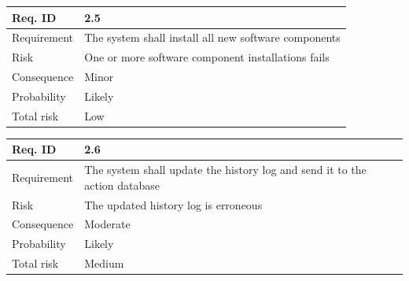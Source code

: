 
\begin{table}[H]
\centering
\begin{tabularx}{1.0\textwidth}{
    |p{}%
    |p{}|%
}
\hline

Req. ID
& 2.5
\\
\hline

Requirement
& The system shall install all new software components
\\
\hline

Risk
& 
One or more software component installations fails
\\
\hline

Consequence
&
Minor
\\
\hline

Probability
&
Likely
\\
\hline

Total risk
&
Low
\\
\hline

\end{tabularx}
\end{table}


\begin{table}[H]
\centering
\begin{tabularx}{1.0\textwidth}{
    |p{}%
    |p{}|%
}
\hline

Req. ID
& 2.6
\\
\hline

Requirement
& The system shall update the history log and send it to the action database
\\
\hline

Risk
& 
The updated history log is erroneous
\\
\hline

Consequence
&
Moderate
\\
\hline

Probability
&
Likely
\\
\hline

Total risk
&
Medium
\\
\hline

\end{tabularx}
\end{table}

